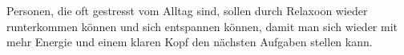 \begin{spacing}{1}
    
    Personen, die oft gestresst vom Alltag sind, sollen durch Relaxoon wieder runterkommen können 
    und sich entspannen können, damit man sich wieder mit mehr Energie und einem klaren Kopf den 
    nächsten Aufgaben stellen kann.

\end{spacing}